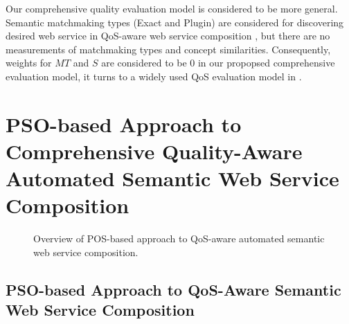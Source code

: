 \documentclass{llncs}
\begin{document}
Our comprehensive quality evaluation model is considered to be more general. Semantic matchmaking types (Exact and Plugin) are considered for discovering desired web service in QoS-aware web service composition  \cite{ma2015hybrid,da2016particle,da2015graphevol}, but there are no measurements of matchmaking types and concept similarities. Consequently, weights for $MT$ and $S$ are considered to be 0 in our propopsed comprehensive evaluation model, it turns to a widely used QoS evaluation model in \cite{ma2015hybrid,da2016particle,da2015graphevol}.
\section{PSO-based Approach to Comprehensive Quality-Aware Automated Semantic Web Service Composition}\label{qswsc_approach}

\begin{figure}[h]
\centering
{}
 \caption{Overview of POS-based approach to QoS-aware automated semantic web service composition.}
 \label{overview}
\end{figure}


\subsection{PSO-based Approach to QoS-Aware Semantic Web Service Composition}
\end{document}
